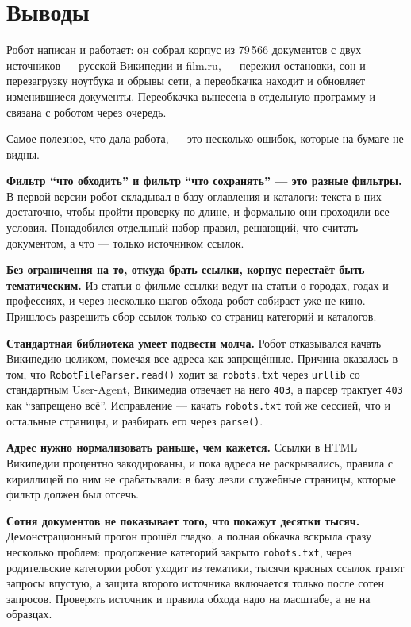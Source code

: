\section{Выводы}

Робот написан и работает: он собрал корпус из 79\,566 документов с двух
источников --- русской Википедии и film.ru, --- пережил остановки, сон и
перезагрузку ноутбука и обрывы сети, а переобкачка находит и обновляет
изменившиеся документы. Переобкачка вынесена в отдельную программу и связана с
роботом через очередь.

Самое полезное, что дала работа, --- это несколько ошибок, которые на бумаге не
видны.

\textbf{Фильтр \enquote{что обходить} и фильтр \enquote{что сохранять} --- это
разные фильтры.} В первой версии робот складывал в базу оглавления и каталоги:
текста в них достаточно, чтобы пройти проверку по длине, и формально они
проходили все условия. Понадобился отдельный набор правил, решающий, что
считать документом, а что --- только источником ссылок.

\textbf{Без ограничения на то, откуда брать ссылки, корпус перестаёт быть
тематическим.} Из статьи о фильме ссылки ведут на статьи о городах, годах и
профессиях, и через несколько шагов обхода робот собирает уже не кино. Пришлось
разрешить сбор ссылок только со страниц категорий и каталогов.

\textbf{Стандартная библиотека умеет подвести молча.} Робот отказывался качать
Википедию целиком, помечая все адреса как запрещённые. Причина оказалась в том,
что \texttt{RobotFileParser.read()} ходит за \texttt{robots.txt} через
\texttt{urllib} со стандартным User-Agent, Викимедиа отвечает на него
\texttt{403}, а парсер трактует \texttt{403} как \enquote{запрещено всё}.
Исправление --- качать \texttt{robots.txt} той же сессией, что и остальные
страницы, и разбирать его через \texttt{parse()}.

\textbf{Адрес нужно нормализовать раньше, чем кажется.} Ссылки в HTML Википедии
процентно закодированы, и пока адреса не раскрывались, правила с кириллицей по
ним не срабатывали: в базу лезли служебные страницы, которые фильтр должен был
отсечь.

\textbf{Сотня документов не показывает того, что покажут десятки тысяч.}
Демонстрационный прогон прошёл гладко, а полная обкачка вскрыла сразу
несколько проблем: продолжение категорий закрыто \texttt{robots.txt}, через
родительские категории робот уходит из тематики, тысячи красных ссылок тратят
запросы впустую, а защита второго источника включается только после сотен
запросов. Проверять источник и правила обхода надо на масштабе, а не на образцах.

